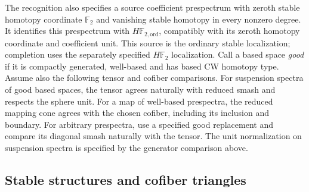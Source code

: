 \begin{definition}
The recognition also specifies a source coefficient prespectrum with
zeroth stable homotopy coordinate $\mathbb F_2$ and vanishing stable
homotopy in every nonzero degree. It identifies this prespectrum with
$H\mathbb F_{2,\mathrm{ord}}$, compatibly with its zeroth homotopy
coordinate and coefficient unit.
This source is the ordinary stable localization; completion uses the
separately specified $H\mathbb F_2$ localization.
Call a based space \emph{good} if it is compactly generated, well-based
and has based CW homotopy type. Assume also the following tensor and
cofiber comparisons. For suspension spectra of good based spaces, the
tensor agrees naturally with reduced smash and respects the sphere unit.
For a map of well-based
prespectra, the reduced mapping cone agrees with the chosen cofiber,
including its inclusion and boundary. For arbitrary prespectra, use a
specified good replacement and compare its diagonal smash naturally
with the tensor. The unit normalization on suspension spectra is specified by the
generator comparison above.
\end{definition}


\subsection*{Stable structures and cofiber triangles}


